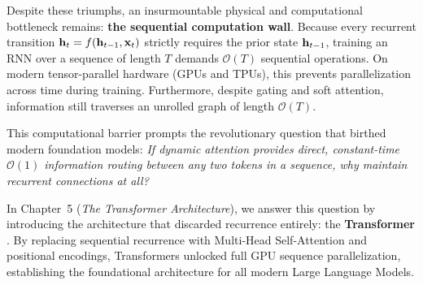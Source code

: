 \documentclass[../../main.tex]{subfiles}
\begin{document}
Despite these triumphs, an insurmountable physical and computational bottleneck remains: \textbf{the sequential computation wall}. Because every recurrent transition $\mathbf{h}_t = f(\mathbf{h}_{t-1}, \mathbf{x}_t)$ strictly requires the prior state $\mathbf{h}_{t-1}$, training an RNN over a sequence of length $T$ demands $\mathcal{O}(T)$ sequential operations. On modern tensor-parallel hardware (GPUs and TPUs), this prevents parallelization across time during training. Furthermore, despite gating and soft attention, information still traverses an unrolled graph of length $\mathcal{O}(T)$.

This computational barrier prompts the revolutionary question that birthed modern foundation models: \emph{If dynamic attention provides direct, constant-time $\mathcal{O}(1)$ information routing between any two tokens in a sequence, why maintain recurrent connections at all?}

In Chapter~5 (\emph{The Transformer Architecture}), we answer this question by introducing the architecture that discarded recurrence entirely: the \textbf{Transformer} \cite{vaswani2017}. By replacing sequential recurrence with Multi-Head Self-Attention and positional encodings, Transformers unlocked full GPU sequence parallelization, establishing the foundational architecture for all modern Large Language Models.
\end{document}
